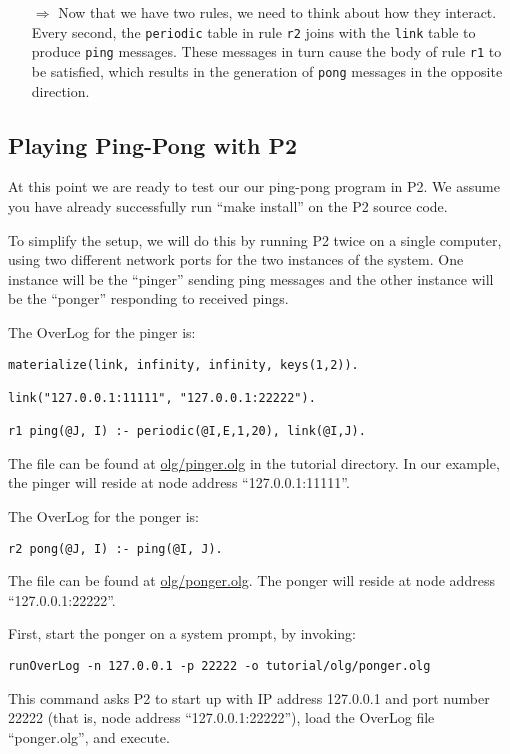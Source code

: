 \documentclass{article}
\begin{document}
\begin{itemize}
\item[$\Longrightarrow$]  Now that we have two rules, we need to think about how
  they interact.  Every second, the \lstinline$periodic$ table in rule
  \lstinline$r2$ joins with the \lstinline$link$ table to produce
  \lstinline$ping$ messages. These messages in turn cause the body of
  rule \lstinline$r1$ to be satisfied, which results in the generation
  of \lstinline$pong$ messages in the opposite direction.
\end{itemize}



\subsection{Playing Ping-Pong with P2}
At this point we are ready to test our our ping-pong program in P2.  We
assume you have already successfully run ``make install'' on the P2
source code.

To simplify the setup, we will do this by running P2 twice on a single
computer, using two different network ports for the two instances of the
system.  One instance will be the ``pinger'' sending ping messages and
the other instance will be the ``ponger'' responding to received pings.

The OverLog for the pinger is:
\begin{lstlisting}
materialize(link, infinity, infinity, keys(1,2)).

link("127.0.0.1:11111", "127.0.0.1:22222").

r1 ping(@J, I) :- periodic(@I,E,1,20), link(@I,J).
\end{lstlisting}
The file can be found at \url{olg/pinger.olg} in the tutorial directory.
In our example, the pinger will reside at
node address ``127.0.0.1:11111''.

The OverLog for the ponger is:
\begin{lstlisting}
r2 pong(@J, I) :- ping(@I, J).
\end{lstlisting}
The file can be found at \url{olg/ponger.olg}. The ponger will reside at
node address ``127.0.0.1:22222''.

First, start the ponger on a system prompt, by invoking:
\begin{verbatim}
runOverLog -n 127.0.0.1 -p 22222 -o tutorial/olg/ponger.olg 
\end{verbatim}
This command asks P2 to start up with IP address 127.0.0.1 and port
number 22222 (that is, node address ``127.0.0.1:22222''), load the
OverLog file ``ponger.olg'', and execute.
\end{document}
